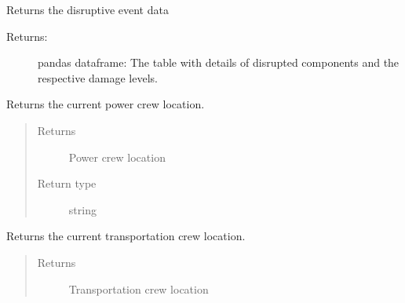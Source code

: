 \documentclass[letterpaper,10pt,english]{sphinxmanual}
\begin{document}
\begin{fulllineitems}
\begin{fulllineitems}
\end{fulllineitems}


\begin{fulllineitems}
\label{\detokenize{apidoc:dreaminsg_integrated_model.src.network_sim_models.integrated_network.IntegratedNetwork.get_disruptive_events}}
\sphinxAtStartPar
Returns the disruptive event data
\begin{description}
\item[{Returns:}] \leavevmode
\sphinxAtStartPar
pandas dataframe: The table with details of disrupted components and the respective damage levels.

\end{description}

\end{fulllineitems}


\begin{fulllineitems}
\label{\detokenize{apidoc:dreaminsg_integrated_model.src.network_sim_models.integrated_network.IntegratedNetwork.get_power_crew_loc}}
\sphinxAtStartPar
Returns the current power crew location.
\begin{quote}\begin{description}
\item[{Returns}] \leavevmode
\sphinxAtStartPar
Power crew location

\item[{Return type}] \leavevmode
\sphinxAtStartPar
string

\end{description}\end{quote}

\end{fulllineitems}


\begin{fulllineitems}
\label{\detokenize{apidoc:dreaminsg_integrated_model.src.network_sim_models.integrated_network.IntegratedNetwork.get_transpo_crew_loc}}
\sphinxAtStartPar
Returns the current transportation crew location.
\begin{quote}\begin{description}
\item[{Returns}] \leavevmode
\sphinxAtStartPar
Transportation crew location


\end{description}
\end{quote}
\end{fulllineitems}
\end{fulllineitems}
\end{document}
